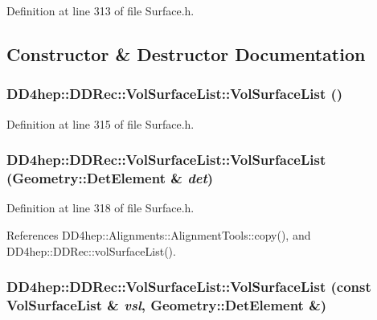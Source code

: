 Definition at line 313 of file Surface.h.

\subsection{Constructor \& Destructor Documentation}
\hypertarget{struct_d_d4hep_1_1_d_d_rec_1_1_vol_surface_list_a507b0bd784bd76bd7db0f321cbeb32cc}{
\subsubsection[{VolSurfaceList}]{\setlength{\rightskip}{0pt plus 5cm}DD4hep::DDRec::VolSurfaceList::VolSurfaceList ()}}
\label{struct_d_d4hep_1_1_d_d_rec_1_1_vol_surface_list_a507b0bd784bd76bd7db0f321cbeb32cc}


Definition at line 315 of file Surface.h.\hypertarget{struct_d_d4hep_1_1_d_d_rec_1_1_vol_surface_list_a0a770b1964232e22b98bb900bdb785f5}{
\subsubsection[{VolSurfaceList}]{\setlength{\rightskip}{0pt plus 5cm}DD4hep::DDRec::VolSurfaceList::VolSurfaceList ({\bf Geometry::DetElement} \& {\em det})}}
\label{struct_d_d4hep_1_1_d_d_rec_1_1_vol_surface_list_a0a770b1964232e22b98bb900bdb785f5}


Definition at line 318 of file Surface.h.

References DD4hep::Alignments::AlignmentTools::copy(), and DD4hep::DDRec::volSurfaceList().\hypertarget{struct_d_d4hep_1_1_d_d_rec_1_1_vol_surface_list_a131b4d74516cb38d5dbc8192c89a03df}{
\subsubsection[{VolSurfaceList}]{\setlength{\rightskip}{0pt plus 5cm}DD4hep::DDRec::VolSurfaceList::VolSurfaceList (const {\bf VolSurfaceList} \& {\em vsl}, \/  {\bf Geometry::DetElement} \&)}}
\label{struct_d_d4hep_1_1_d_d_rec_1_1_vol_surface_list_a131b4d74516cb38d5dbc8192c89a03df}


